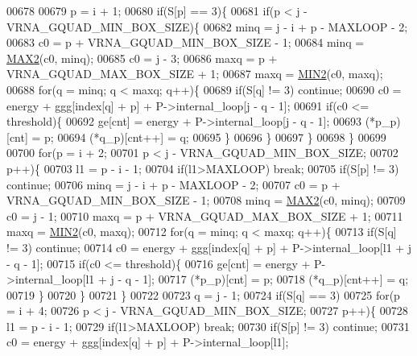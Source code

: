 \begin{DoxyCode}
00678 
00679   p = i + 1;
00680   \textcolor{keywordflow}{if}(S[p] == 3)\{
00681     \textcolor{keywordflow}{if}(p < j - VRNA\_GQUAD\_MIN\_BOX\_SIZE)\{
00682       minq  = j - i + p - MAXLOOP - 2;
00683       c0    = p + VRNA\_GQUAD\_MIN\_BOX\_SIZE - 1;
00684       minq  = \hyperlink{group__utils_ga33297b3679c713b0c4d897cd0fe3b122}{MAX2}(c0, minq);
00685       c0    = j - 3;
00686       maxq  = p + VRNA\_GQUAD\_MAX\_BOX\_SIZE + 1;
00687       maxq  = \hyperlink{group__utils_gae0b9cd0ce090bd69b951aa73e8fa4f7d}{MIN2}(c0, maxq);
00688       \textcolor{keywordflow}{for}(q = minq; q < maxq; q++)\{
00689         \textcolor{keywordflow}{if}(S[q] != 3) \textcolor{keywordflow}{continue};
00690         c0  = energy + ggg[index[q] + p] + P->internal\_loop[j - q - 1];
00691         \textcolor{keywordflow}{if}(c0 <= threshold)\{
00692           ge[cnt]       = energy + P->internal\_loop[j - q - 1];
00693           (*p\_p)[cnt]   = p;
00694           (*q\_p)[cnt++] = q;
00695         \}
00696       \}
00697     \}
00698   \}
00699 
00700   \textcolor{keywordflow}{for}(p = i + 2;
00701       p < j - VRNA\_GQUAD\_MIN\_BOX\_SIZE;
00702       p++)\{
00703     l1    = p - i - 1;
00704     \textcolor{keywordflow}{if}(l1>MAXLOOP) \textcolor{keywordflow}{break};
00705     \textcolor{keywordflow}{if}(S[p] != 3) \textcolor{keywordflow}{continue};
00706     minq  = j - i + p - MAXLOOP - 2;
00707     c0    = p + VRNA\_GQUAD\_MIN\_BOX\_SIZE - 1;
00708     minq  = \hyperlink{group__utils_ga33297b3679c713b0c4d897cd0fe3b122}{MAX2}(c0, minq);
00709     c0    = j - 1;
00710     maxq  = p + VRNA\_GQUAD\_MAX\_BOX\_SIZE + 1;
00711     maxq  = \hyperlink{group__utils_gae0b9cd0ce090bd69b951aa73e8fa4f7d}{MIN2}(c0, maxq);
00712     \textcolor{keywordflow}{for}(q = minq; q < maxq; q++)\{
00713       \textcolor{keywordflow}{if}(S[q] != 3) \textcolor{keywordflow}{continue};
00714       c0  = energy + ggg[index[q] + p] + P->internal\_loop[l1 + j - q - 1];
00715         \textcolor{keywordflow}{if}(c0 <= threshold)\{
00716           ge[cnt]       = energy + P->internal\_loop[l1 + j - q - 1];
00717           (*p\_p)[cnt]   = p;
00718           (*q\_p)[cnt++] = q;
00719         \}
00720     \}
00721   \}
00722 
00723   q = j - 1;
00724   \textcolor{keywordflow}{if}(S[q] == 3)
00725     \textcolor{keywordflow}{for}(p = i + 4;
00726         p < j - VRNA\_GQUAD\_MIN\_BOX\_SIZE;
00727         p++)\{
00728       l1    = p - i - 1;
00729       \textcolor{keywordflow}{if}(l1>MAXLOOP) \textcolor{keywordflow}{break};
00730       \textcolor{keywordflow}{if}(S[p] != 3) \textcolor{keywordflow}{continue};
00731       c0  = energy + ggg[index[q] + p] + P->internal\_loop[l1];

\end{DoxyCode}
